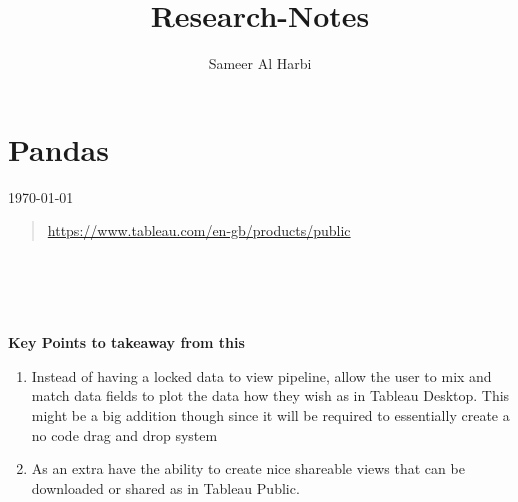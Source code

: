 \documentclass{paper}
\title{Research-Notes}
\author{Sameer Al Harbi}
\begin{document}
\part{Pandas}
\today
\begin{quote}
\url{https://www.tableau.com/en-gb/products/public}
\end{quote}
\\
\\
\\
\\
\textbf{Key Points to takeaway from this}
\begin{enumerate}
    \item Instead of having a locked data to view pipeline, allow the user to mix and match data fields to plot the data how they wish as in Tableau Desktop. This might be a big addition though since it will be required to essentially create a no code drag and drop system
    \item As an extra have the ability to create nice shareable views that can be downloaded or shared as in Tableau Public.  
    
\end{enumerate}
\end{document}
